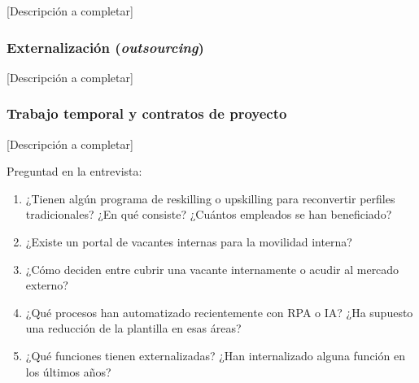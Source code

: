 [Descripción a completar]

\subsubsection{Externalización (\textit{outsourcing})}


[Descripción a completar]

\subsubsection{Trabajo temporal y contratos de proyecto}

[Descripción a completar]

\begin{notaequipo}
  Preguntad en la entrevista:
  \begin{enumerate}
    \item ¿Tienen algún programa de reskilling o upskilling para reconvertir
          perfiles tradicionales? ¿En qué consiste? ¿Cuántos empleados
          se han beneficiado?
    \item ¿Existe un portal de vacantes internas para la movilidad interna?
    \item ¿Cómo deciden entre cubrir una vacante internamente o acudir
          al mercado externo?
    \item ¿Qué procesos han automatizado recientemente con RPA o IA?
          ¿Ha supuesto una reducción de la plantilla en esas áreas?
    \item ¿Qué funciones tienen externalizadas? ¿Han internalizado alguna
          función en los últimos años?
  \end{enumerate}
\end{notaequipo}
